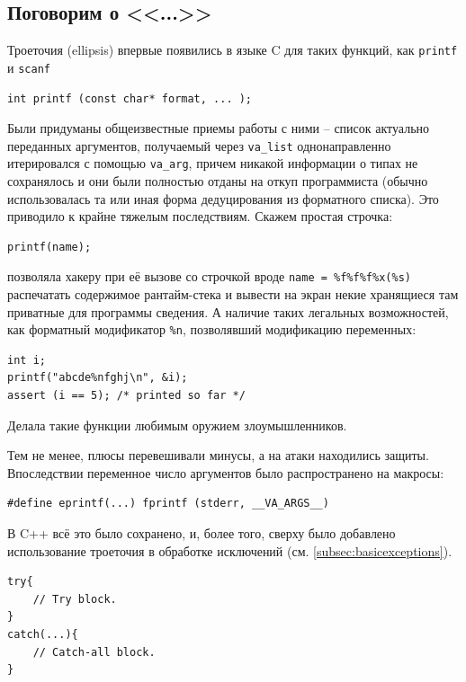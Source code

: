 \documentclass[a4paper,12pt,oneside]{book}
\renewcommand{\texttt}[2][black]{\textcolor{#1}{\ttfamily #2}}
\begin{document}
\subsection{Поговорим о <<\texttt{...}>>}

Троеточия (ellipsis) впервые появились в языке C для таких функций, как \lstinline!printf! и \lstinline!scanf! 

\begin{lstlisting}
int printf (const char* format, ... );
\end{lstlisting}

Были придуманы общеизвестные приемы работы с ними -- список актуально переданных аргументов, получаемый через \lstinline!va_list! однонаправленно итерировался с помощью \lstinline!va_arg!, причем никакой информации о типах не сохранялось и они были полностью отданы на откуп программиста (обычно использовалась та или иная форма дедуцирования из форматного списка). Это приводило к крайне тяжелым последствиям. Скажем простая строчка:

\begin{lstlisting}
printf(name);
\end{lstlisting}

позволяла хакеру при её вызове со строчкой вроде \lstinline!name = %f%f%f%x(%s)! распечатать содержимое рантайм-стека и вывести на экран некие хранящиеся там приватные для программы сведения. А наличие таких легальных возможностей, как форматный модификатор \lstinline!%n!, позволявший модификацию переменных:

\begin{lstlisting}
int i;
printf("abcde%nfghj\n", &i);
assert (i == 5); /* printed so far */
\end{lstlisting}

Делала такие функции любимым оружием злоумышленников. 

Тем не менее, плюсы перевешивали минусы, а на атаки находились защиты. Впоследствии переменное число аргументов было распространено на макросы:

\begin{lstlisting}
#define eprintf(...) fprintf (stderr, __VA_ARGS__)
\end{lstlisting}

В C++ всё это было сохранено, и, более того, сверху было добавлено использование троеточия в обработке исключений (см. \ref{subsec:basicexceptions}).

\begin{lstlisting}
try{
    // Try block.
}
catch(...){
    // Catch-all block.
}
\end{lstlisting}
\end{document}
